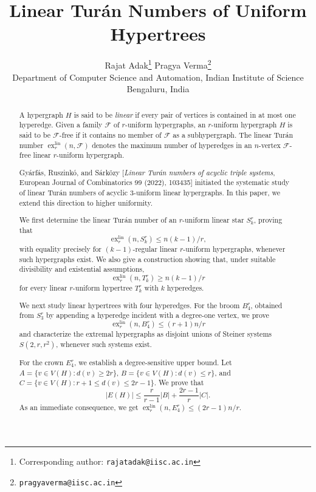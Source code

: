 \documentclass[11pt,a4paper]{article}
\theoremstyle{definition}
\theoremstyle{remark}
\begin{document}
\title{Linear Tur\'an Numbers of Uniform Hypertrees}
\author{Rajat Adak\thanks{Corresponding author: \texttt{rajatadak@iisc.ac.in}}
\quad Pragya Verma\thanks{\texttt{pragyaverma@iisc.ac.in}}\\[0.5em]
\small Department of Computer Science and Automation, Indian Institute of Science\\
\small Bengaluru, India}
\date{}

\maketitle

\begin{abstract}
A hypergraph \(H\) is said to be \emph{linear} if every pair of
vertices is contained in at most one hyperedge. Given a family
\(\mathcal{F}\) of \(r\)-uniform hypergraphs, an \(r\)-uniform
hypergraph \(H\) is said to be \(\mathcal{F}\)-free if it contains no
member of \(\mathcal{F}\) as a subhypergraph. The linear Tur\'an
number \(\operatorname{ex}^{\mathrm{lin}}_r(n,\mathcal{F})\) denotes
the maximum number of hyperedges in an \(n\)-vertex
\(\mathcal{F}\)-free linear \(r\)-uniform hypergraph.

Gy\'arf\'as, Ruszink\'o, and S\'ark\"ozy
[\emph{Linear Tur\'an numbers of acyclic triple systems},
European Journal of Combinatorics 99 (2022), 103435]
initiated the systematic study of linear Tur\'an numbers of acyclic
\(3\)-uniform linear hypergraphs. In this paper, we extend this
direction to higher uniformity.

We first determine the linear Tur\'an number of an \(r\)-uniform
linear star \(S_k^r\), proving that
$$\operatorname{ex}^{\mathrm{lin}}_r(n,S_k^r)
\leq n(k-1)/r,$$ with equality precisely for
\((k-1)\)-regular linear \(r\)-uniform hypergraphs, whenever such
hypergraphs exist. We also give a construction showing that, under
suitable divisibility and existential assumptions,
$$\operatorname{ex}^{\mathrm{lin}}_r(n,T_k^r)
\geq n(k-1)/r$$ for every linear \(r\)-uniform hypertree \(T_k^r\)
with \(k\) hyperedges.

We next study linear hypertrees with four hyperedges. For the broom
\(B_4^r\), obtained from \(S_3^r\) by appending a hyperedge incident
with a degree-one vertex, we prove
$$\operatorname{ex}^{\mathrm{lin}}_r(n,B_4^r)
\leq (r+1)n/r$$ and characterize the extremal hypergraphs as disjoint
unions of Steiner systems \(S(2,r,r^2)\), whenever such systems
exist.

For the crown \(E_4^r\), we establish a degree-sensitive upper bound.
Let
\(A=\{v\in V(H):d(v)\geq2r\}\),
\(B=\{v\in V(H):d(v)\leq r\}\), and
\(C=\{v\in V(H):r+1\leq d(v)\leq2r-1\}\).
We prove that
$$\lvert E(H)\rvert\leq
\frac{r}{r-1}\lvert B\rvert+
\frac{2r-1}{r}\lvert C\rvert.$$
As an immediate consequence, we get
\(\operatorname{ex}^{\mathrm{lin}}_r(n,E_4^r)
\leq(2r-1)n/r\). 


\end{abstract}
\end{document}
